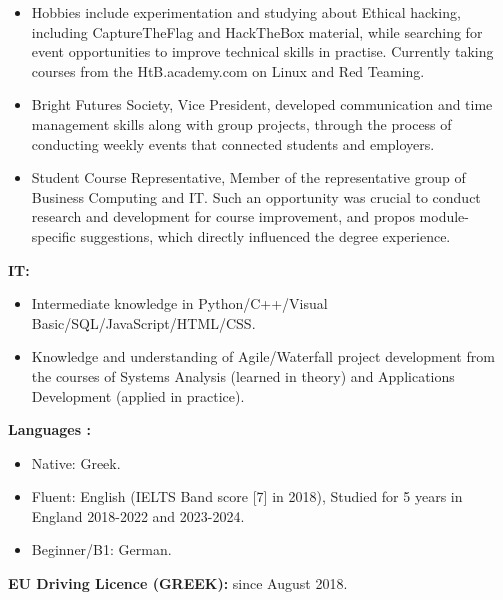 \begin{itemize}
    \item Hobbies include experimentation and studying about Ethical hacking, including CaptureTheFlag and HackTheBox material, while searching for event opportunities to improve technical skills in practise. Currently taking courses from the HtB.academy.com on Linux and Red Teaming.
    \item Bright Futures Society, Vice President, developed communication and time management skills along with group projects, through the process of conducting weekly events that connected students and employers.
    \item Student Course Representative, Member of the representative group of Business Computing and IT. Such an opportunity was crucial to conduct research and development for course improvement, and propos module-specific suggestions, which directly influenced the degree experience.

\end{itemize}




\textbf{IT: }
\begin{itemize}
    \item Intermediate knowledge in Python/C++/Visual Basic/SQL/JavaScript/HTML/CSS.
    \item Knowledge and understanding of Agile/Waterfall project development from the courses of Systems Analysis (learned in theory) and Applications Development (applied in practice).
\end{itemize}

\textbf{Languages :}
\begin{itemize}
    \item Native: Greek.
    \item Fluent: English (IELTS Band score [7] in 2018), Studied for 5 years in England 2018-2022 and 2023-2024.
    \item Beginner/B1: German.
\end{itemize}

\textbf{EU Driving Licence (GREEK):} since August 2018.
